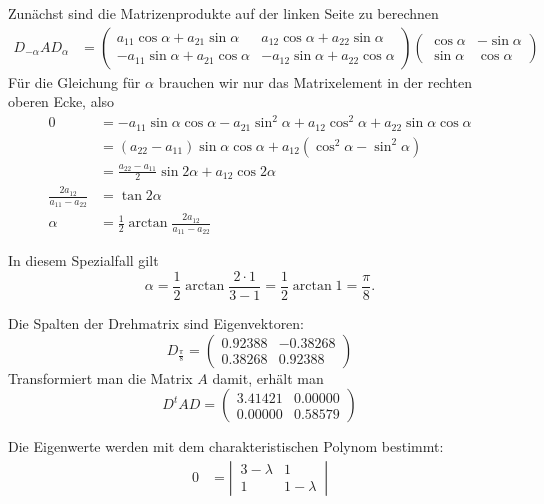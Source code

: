 \begin{loesung}
\begin{teilaufgaben}
\item Zunächst sind die Matrizenprodukte auf der linken Seite zu berechnen
\begin{align*}
D_{-\alpha}AD_{\alpha}
&=
\begin{pmatrix}
 a_{11}\cos\alpha+a_{21}\sin\alpha & a_{12}\cos\alpha + a_{22}\sin\alpha\\
-a_{11}\sin\alpha+a_{21}\cos\alpha &-a_{12}\sin\alpha + a_{22}\cos\alpha
\end{pmatrix}
\begin{pmatrix}
 \cos\alpha&-\sin\alpha\\
 \sin\alpha& \cos\alpha
\end{pmatrix}
\end{align*}
Für die Gleichung für $\alpha$ brauchen wir nur das Matrixelement
in der rechten oberen Ecke, also
\begin{align*}
0
&=
-a_{11}\sin\alpha\cos\alpha -a_{21}\sin^2\alpha+a_{12}\cos^2\alpha+a_{22}\sin\alpha\cos\alpha
\\
&=
(a_{22}-a_{11})\sin\alpha\cos\alpha+a_{12}(\cos^2\alpha-\sin^2\alpha)
\\
&=
\frac{a_{22}-a_{11}}2\sin2\alpha +a_{12}\cos 2\alpha
\\
\frac{2a_{12}}{a_{11}-a_{22}}
&=
\tan2\alpha
\\
\alpha&=\frac12\arctan\frac{2a_{12}}{a_{11}-a_{22}}
\end{align*}
\item
In diesem Spezialfall gilt
\[
\alpha=\frac12\arctan\frac{2\cdot 1}{3 - 1}=\frac12\arctan 1=\frac{\pi}8.
\]
\item
Die Spalten der Drehmatrix sind Eigenvektoren:
\[
D_{\frac{\pi}8}=\begin{pmatrix}
   0.92388& -0.38268\\
   0.38268&  0.92388
\end{pmatrix}
\]
Transformiert man die Matrix $A$ damit, erhält man
\[
D^tAD=
\begin{pmatrix}
   3.41421&  0.00000\\
   0.00000&  0.58579
\end{pmatrix}
\]
\item
Die Eigenwerte werden mit dem charakteristischen Polynom bestimmt:
\begin{align*}
0&=\left|\,\begin{matrix}3-\lambda&1\\1&1-\lambda\end{matrix}\,\right|

\end{align*}
\end{teilaufgaben}
\end{loesung}
